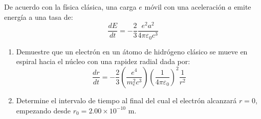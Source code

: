 \item De acuerdo con la física clásica, una carga $e$ móvil con una aceleración $a$ emite energía a una tasa de:
$$ \frac{dE}{dt} = -\frac{2}{3} \frac{e^2 a^2}{4\pi\varepsilon_0 c^3} $$
\begin{enumerate}
    \item Demuestre que un electrón en un átomo de hidrógeno clásico se mueve en espiral hacia el núcleo con una rapidez radial dada por:
    $$ \frac{dr}{dt} = -\frac{2}{3} \left( \frac{e^4}{m_e^2 c^3} \right) \left( \frac{1}{4\pi\varepsilon_0} \right)^2 \frac{1}{r^2} $$
    \item Determine el intervalo de tiempo al final del cual el electrón alcanzará $r = 0$, empezando desde $r_0 = 2.00 \times 10^{-10}\text{ m}$.
\end{enumerate}